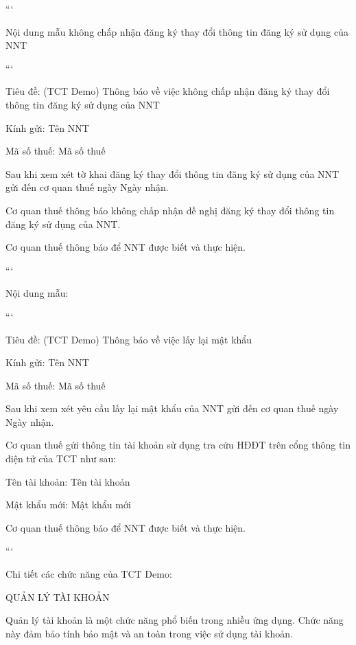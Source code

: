 ```

Nội dung mẫu không chấp nhận đăng ký thay đổi thông tin đăng ký sử dụng của NNT

```

Tiêu đề: (TCT Demo) Thông báo về việc không chấp nhận đăng ký thay đổi thông tin đăng ký sử dụng của NNT

Kính gửi: {{Tên NNT}}

Mã số thuế: {{Mã số thuế}}

Sau khi xem xét tờ khai đăng ký thay đổi thông tin đăng ký sử dụng của NNT gửi đến cơ quan thuế ngày {{Ngày nhận}}.

Cơ quan thuế thông báo không chấp nhận đề nghị đăng ký thay đổi thông tin đăng ký sử dụng của NNT.

Cơ quan thuế thông báo để NNT được biết và thực hiện.

```









Nội dung mẫu:

```

Tiêu đề: (TCT Demo) Thông báo về việc lấy lại mật khẩu

Kính gửi: {{Tên NNT}}

Mã số thuế: {{Mã số thuế}}

Sau khi xem xét yêu cầu lấy lại mật khẩu của NNT gửi đến cơ quan thuế ngày {{Ngày nhận}}.

Cơ quan thuế gửi thông tin tài khoản sử dụng tra cứu HĐĐT trên cổng thông tin điện tử của TCT như sau:

Tên tài khoản: {{Tên tài khoản}}

Mật khẩu mới: {{Mật khẩu mới}}

Cơ quan thuế thông báo để NNT được biết và thực hiện.

```


Chi tiết các chức năng của TCT Demo:

QUẢN LÝ TÀI KHOẢN

Quản lý tài khoản là một chức năng phổ biến trong nhiều ứng dụng. Chức năng này đảm bảo tính bảo mật và an toàn trong việc sử dụng tài khoản.

